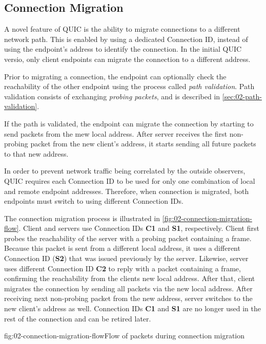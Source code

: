 \subsection{Connection Migration}

A novel feature of QUIC is the ability to migrate connections to a different network path. This is
enabled by using a dedicated Connection ID, instead of using the endpoint's address to identify the
connection. In the initial QUIC versio, only client endpoints can migrate the connection to a
different address.

Prior to migrating a connection, the endpoint can optionally check the reachability of the other
endpoint using the process called \textit{path validation}. Path validation consists of exchanging
\textit{probing packets}, and is described in \autoref{sec:02-path-validation}.

If the path is validated, the endpoint can migrate the connection by starting to send packets from
the mew local address. After server receives the first non-probing packet from the new client's
address, it starts sending all future packets to that new address.

In order to prevent network traffic being correlated by the outside observers, QUIC requires each
Connection ID to be used for only one combination of local and remote endpoint addresses. Therefore,
when connection is migrated, both endpoints must switch to using different Connection IDs.

The connection migration process is illustrated in \autoref{fig:02-connection-migration-flow}.
Client and servers use Connection IDs \textbf{C1} and \textbf{S1}, respectively. Client first probes
the reachability of the server with a probing packet containing a \PATHCHALLENGE{} frame. Because
this packet is sent from a different local address, it uses a different Connection ID (\textbf{S2})
that was issued previously by the server. Likewise, server uses different Connection ID \textbf{C2}
to reply with a packet containing a \PATHRESPONSE{} frame, confirming the reachability from the
clients new local address. After that, client migrates the connection by sending all packets via the
new local address. After receiving next non-probing packet from the new address, server switches to
the new client's address as well. Connection IDs \textbf{C1} and \textbf{S1} are no longer used in
the rest of the connection and can be retired later.

\begin{myFigure}{fig:02-connection-migration-flow}{Flow of packets during connection migration}

\resizebox{\linewidth}{!}{}

\end{myFigure}

